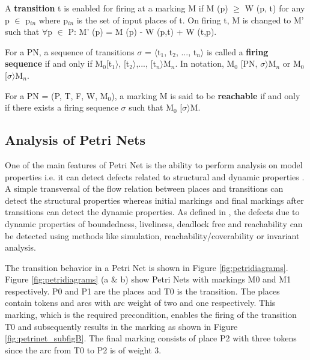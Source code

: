 \begin{definition}
\label{def:def3}
A \textbf{transition} t is enabled for firing at a marking M if M (p) $ \geq $ W (p, t) for any p $ \in $ p$ _{in} $ where p$ _{in} $ is the set of input places of t. On firing t, M is changed to M' such that $ \forall $p $ \in $ P: M' (p) = M (p) - W (p,t) + W (t,p). 
\end{definition}

\begin{definition}
\label{def:def4}
For a PN, a sequence of transitions $ \sigma $ = $ \langle $t$_{1}$, t$_{2}$, ..., t$_{n} \rangle $ is called a \textbf{firing sequence} if and only if M$_{0}$[t$_{1} \rangle $, [t$_{2} \rangle $,..., [t$_{n} \rangle $M$_{n}$. In notation, M$_{0}$ [PN, $ \sigma \rangle $M$_{n}$ or M$_{0}$ [$ \sigma \rangle $M$_{n}$.
\end{definition}

\begin{definition}
\label{def:def5}
For a PN = (P, T, F, W, M$_{0}$), a marking M is said to be \textbf{reachable} if and only if there exists a firing sequence $ \sigma $ such that M$_{0}$ [$ \sigma \rangle $M.
\end{definition}


\subsection{Analysis of Petri Nets}
One of the main features of Petri Net is the ability to perform analysis on model properties i.e. it can detect defects related to structural and dynamic properties \cite{murata1989petri}. A simple transversal of the flow relation between places and transitions can detect the structural properties whereas initial markings and final markings after transitions can detect the dynamic properties. As defined in \cite{reisig2012petri}, the defects due to dynamic properties of boundedness, liveliness, deadlock free and reachability can be detected using methods like simulation, reachability/coverability or invariant analysis.

 The transition behavior in a Petri Net is shown in Figure \ref{fig:petridiagrams}. Figure \ref{fig:petridiagrams} (a \& b) show Petri Nets with markings M0 and M1 respectively.  P0 and P1 are the places and T0 is the transition. The places contain tokens and arcs with arc weight of two and one respectively. This marking, which is the required precondition, enables the firing of the transition T0 and subsequently results in the marking as shown in Figure  \ref{fig:petrinet_subfigB}.  The final marking consists of place P2 with three tokens since the arc from T0 to P2 is of weight 3. 

